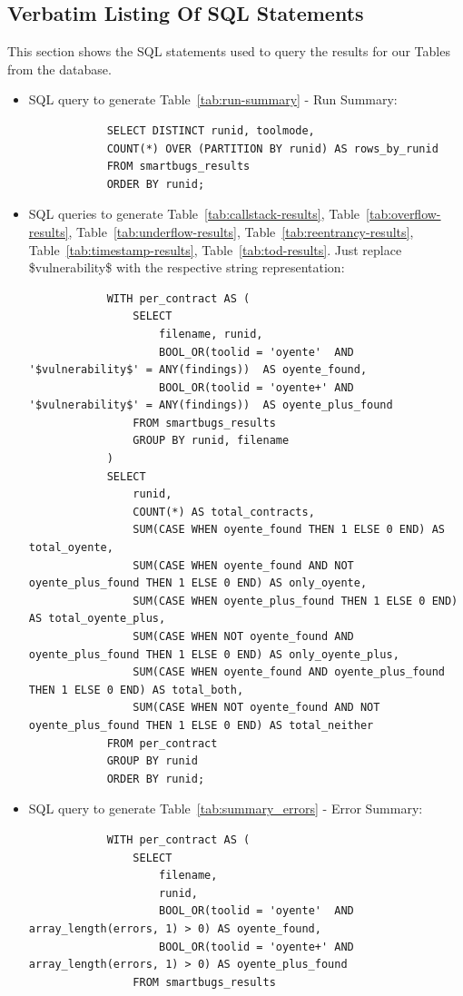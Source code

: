 \documentclass{article}
\begin{document}
	\subsection*{Verbatim Listing Of SQL Statements}
	This section shows the SQL statements used to query the results for our Tables from the database.

	\begin{itemize}
		\item SQL query to generate Table~\ref{tab:run-summary} - Run Summary:
		\begin{verbatim}
			SELECT DISTINCT runid, toolmode,
			COUNT(*) OVER (PARTITION BY runid) AS rows_by_runid
			FROM smartbugs_results
			ORDER BY runid;
		\end{verbatim}
		\item SQL queries to generate Table~\ref{tab:callstack-results}, Table~\ref{tab:overflow-results}, Table~\ref{tab:underflow-results}, Table~\ref{tab:reentrancy-results}, Table~\ref{tab:timestamp-results},
		Table~\ref{tab:tod-results}. Just replace \$vulnerability\$ with the respective string representation:
		\begin{verbatim}
			WITH per_contract AS (
				SELECT
					filename, runid,
					BOOL_OR(toolid = 'oyente'  AND '$vulnerability$' = ANY(findings))  AS oyente_found,
					BOOL_OR(toolid = 'oyente+' AND '$vulnerability$' = ANY(findings))  AS oyente_plus_found
				FROM smartbugs_results
				GROUP BY runid, filename
			)
			SELECT
				runid,
				COUNT(*) AS total_contracts,
				SUM(CASE WHEN oyente_found THEN 1 ELSE 0 END) AS total_oyente,
				SUM(CASE WHEN oyente_found AND NOT oyente_plus_found THEN 1 ELSE 0 END) AS only_oyente,
				SUM(CASE WHEN oyente_plus_found THEN 1 ELSE 0 END) AS total_oyente_plus,
				SUM(CASE WHEN NOT oyente_found AND oyente_plus_found THEN 1 ELSE 0 END) AS only_oyente_plus,
				SUM(CASE WHEN oyente_found AND oyente_plus_found THEN 1 ELSE 0 END) AS total_both,
				SUM(CASE WHEN NOT oyente_found AND NOT oyente_plus_found THEN 1 ELSE 0 END) AS total_neither
			FROM per_contract
			GROUP BY runid
			ORDER BY runid;
		\end{verbatim}
		\item SQL query to generate Table~\ref{tab:summary_errors} - Error Summary:
		\begin{verbatim}
			WITH per_contract AS (
				SELECT
					filename,
					runid,
					BOOL_OR(toolid = 'oyente'  AND array_length(errors, 1) > 0) AS oyente_found,
					BOOL_OR(toolid = 'oyente+' AND array_length(errors, 1) > 0) AS oyente_plus_found
				FROM smartbugs_results

\end{verbatim}
\end{itemize}
\end{document}
